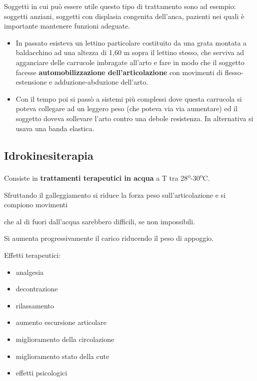 Soggetti in cui può essere utile questo tipo di trattamento sono ad
esempio: soggetti anziani, soggetti con displasia congenita dell'anca,
pazienti nei quali è importante mantenere funzioni adeguate.

\begin{itemize}
\item
  In passato esisteva un lettino particolare costituito da una grata
  montata a baldacchino ad una altezza di 1,60 m sopra il lettino
  stesso, che serviva ad agganciare delle carrucole imbragate all'arto e
  fare in modo che il soggetto facesse \textbf{automobilizzazione
  dell'articolazione} con movimenti di flesso-estensione e
  adduzione-abduzione dell'arto.
\item
  Con il tempo poi si passò a sistemi più complessi dove questa
  carrucola si poteva collegare ad un leggero peso (che poteva via via
  aumentare) ed il soggetto doveva sollevare l'arto contro una debole
  resistenza. In alternativa si usava una banda elastica.
\end{itemize}

\subsection{Idrokinesiterapia}


Consiste in \textbf{trattamenti terapeutici in acqua} a T tra 28\textsuperscript{o}-30\textsuperscript{o}C.


Sfruttando il galleggiamento si riduce la forza peso sull'articolazione
e si compiono movimenti

che al di fuori dall'acqua sarebbero difficili, se non impossibili.

Si aumenta progressivamente il carico riducendo il peso di appoggio.

Effetti terapeutici:

\begin{itemize}
\item
  
  analgesia
  
\item
  
  decontrazione
  
\item
  
  rilassamento
  
\item
  
  aumento escursione articolare
  
\item
  
  miglioramento della circolazione
  
\item
  
  miglioramento stato della cute
  
\item
  
  effetti psicologici
  
\end{itemize}

